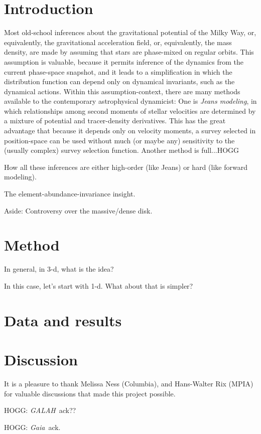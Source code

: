 \documentclass[modern]{aastex62}
\newcommand{\acronym}[1]{{\small{#1}}}
\newcommand{\project}[1]{\textsl{#1}}
\newcommand{\galah}{\project{\acronym{GALAH}}}
\newcommand{\gaia}{\project{Gaia}}
\begin{document}

\section{Introduction}

Most old-school inferences about the gravitational potential of the
Milky Way, or, equivalently, the gravitational acceleration field, or,
equivalently, the mass density, are made by assuming that stars are
phase-mixed on regular orbits.
This assumption is valuable, because it permits inference of the
dynamics from the current phase-space snapshot, and it leads to a
simplification in which the distribution function can depend only on
dynamical invariants, such as the dynamical actions.
Within this assumption-context, there are many methods available to the
contemporary astrophysical dynamicist:
One is \emph{Jeans modeling}, in which relationships among second moments
of stellar velocities are determined by a mixture of potential and
tracer-density derivatives.
This has the great advantage that because it depends only on velocity
moments, a survey selected in position-space can be used without much
(or maybe any) sensitivity to the (usually complex) survey selection
function.
Another method is full...HOGG

How all these inferences are either high-order (like Jeans) or hard (like forward modeling).

The element-abundance-invariance insight.

Aside: Controversy over the massive/dense disk.

\section{Method}

In general, in 3-d, what is the idea?

In this case, let's start with 1-d. What about that is simpler?

\section{Data and results}

\section{Discussion}

\acknowledgements
It is a pleasure to thank
  Melissa Ness (Columbia),
  and
  Hans-Walter Rix (\acronym{MPIA})
for valuable discussions that made this project possible.

HOGG: \galah\ ack??

HOGG: \gaia\ ack.
\end{document}
